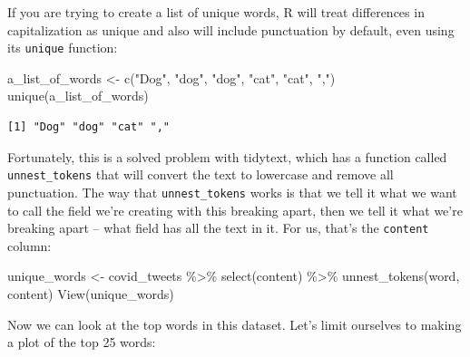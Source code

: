 \documentclass[
  letterpaper,
  DIV=11,
  numbers=noendperiod]{scrreprt}
\newenvironment{Shaded}{\begin{snugshade}}{\end{snugshade}}
\newcommand{\FunctionTok}[1]{\textcolor[rgb]{0.28,0.35,0.67}{#1}}
\newcommand{\NormalTok}[1]{\textcolor[rgb]{0.00,0.23,0.31}{#1}}
\newcommand{\OtherTok}[1]{\textcolor[rgb]{0.00,0.23,0.31}{#1}}
\newcommand{\SpecialCharTok}[1]{\textcolor[rgb]{0.37,0.37,0.37}{#1}}
\newcommand{\StringTok}[1]{\textcolor[rgb]{0.13,0.47,0.30}{#1}}
\begin{document}
If you are trying to create a list of unique words, R will treat
differences in capitalization as unique and also will include
punctuation by default, even using its \texttt{unique} function:

\begin{Shaded}
\begin{Highlighting}[]
\NormalTok{a\_list\_of\_words }\OtherTok{\textless{}{-}} \FunctionTok{c}\NormalTok{(}\StringTok{"Dog"}\NormalTok{, }\StringTok{"dog"}\NormalTok{, }\StringTok{"dog"}\NormalTok{, }\StringTok{"cat"}\NormalTok{, }\StringTok{"cat"}\NormalTok{, }\StringTok{","}\NormalTok{)}
\FunctionTok{unique}\NormalTok{(a\_list\_of\_words)}
\end{Highlighting}
\end{Shaded}

\begin{verbatim}
[1] "Dog" "dog" "cat" ","  
\end{verbatim}

Fortunately, this is a solved problem with tidytext, which has a
function called \texttt{unnest\_tokens} that will convert the text to
lowercase and remove all punctuation. The way that
\texttt{unnest\_tokens} works is that we tell it what we want to call
the field we're creating with this breaking apart, then we tell it what
we're breaking apart -- what field has all the text in it. For us,
that's the \texttt{content} column:

\begin{Shaded}
\begin{Highlighting}[]
\NormalTok{unique\_words }\OtherTok{\textless{}{-}}\NormalTok{ covid\_tweets }\SpecialCharTok{\%\textgreater{}\%} \FunctionTok{select}\NormalTok{(content) }\SpecialCharTok{\%\textgreater{}\%}
  \FunctionTok{unnest\_tokens}\NormalTok{(word, content)}
\FunctionTok{View}\NormalTok{(unique\_words)}
\end{Highlighting}
\end{Shaded}

Now we can look at the top words in this dataset. Let's limit ourselves
to making a plot of the top 25 words:
\end{document}
